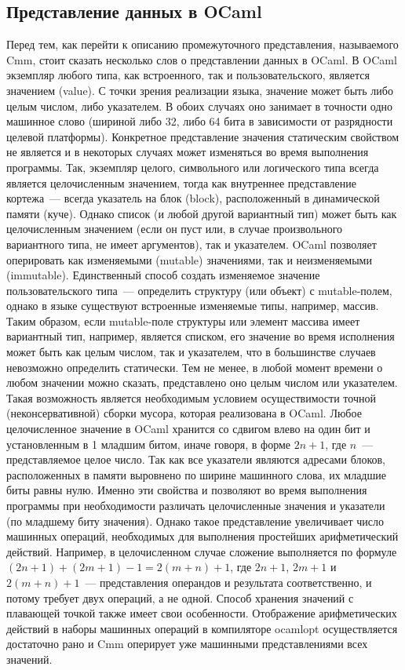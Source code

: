 \documentclass[a4paper, 12pt]{article}
\begin{document}
\subsection{Представление данных в OCaml}
Перед тем, как перейти к описанию промежуточного представления, называемого Cmm, стоит сказать несколько слов о
представлении данных в OCaml. В OCaml экземпляр любого типа, как встроенного, так и пользовательского, является
значением (value). С точки зрения реализации языка, значение может быть либо целым числом, либо указателем. В обоих
случаях оно занимает в точности одно машинное слово (шириной либо 32, либо 64 бита в зависимости от разрядности целевой
платформы). Конкретное представление значения статическим свойством не является и в некоторых случаях может изменяться
во время выполнения программы. Так, экземпляр целого, символьного или логического типа всегда является целочисленным
значением, тогда как внутреннее представление кортежа~--- всегда указатель на блок (block), расположенный в динамической
памяти (куче). Однако список (и любой другой вариантный тип) может быть как целочисленным значением (если он пуст или, в
случае произвольного вариантного типа, не имеет аргументов), так и указателем. OCaml позволяет оперировать как
изменяемыми (mutable) значениями, так и неизменяемыми (immutable). Единственный способ создать изменяемое значение
пользовательского типа~--- определить структуру (или объект) с mutable-полем, однако в языке существуют встроенные
изменяемые типы, например, массив. Таким образом, если mutable-поле структуры или элемент массива имеет вариантный тип,
например, является списком, его значение во время исполнения может быть как целым числом, так и указателем, что в
большинстве случаев невозможно определить статически. Тем не менее, в любой момент времени о любом значении можно
сказать, представлено оно целым числом или указателем. Такая возможность является необходимым условием осуществимости
точной (неконсервативной) сборки мусора, которая реализована в OCaml. Любое целочисленное значение в OCaml хранится со
сдвигом влево на один бит и установленным в 1 младшим битом, иначе говоря, в форме $2n + 1$, где $n$~--- представляемое
целое число. Так как все указатели являются адресами блоков, расположенных в памяти выровнено по ширине машинного слова,
их младшие биты равны нулю. Именно эти свойства и позволяют во время выполнения программы при необходимости различать
целочисленные значения и указатели (по младшему биту значения). Однако такое представление увеличивает число машинных
операций, необходимых для выполнения простейших арифметический действий. Например, в целочисленном случае сложение
выполняется по формуле $(2n + 1) + (2m + 1) - 1 = 2(m + n) + 1$, где $2n + 1$, $2m + 1$ и $2(m + n) + 1$~---
представления операндов и результата соответственно, и потому требует двух операций, а не одной. Способ хранения
значений с плавающей точкой также имеет свои особенности. Отображение арифметических действий в наборы машинных операций
в компиляторе ocamlopt осуществляется достаточно рано и Cmm оперирует уже машинными представлениями всех значений.
\end{document}
